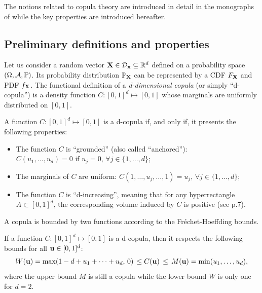 The notions related to copula theory are introduced in detail in the monographs of \citet{nelsen_2006_copulas,joe_2014,durante_2015_copula} while the key properties are introduced hereafter.


\subsection{Preliminary definitions and properties}\label{sec:copula_prelims}

Let us consider a random vector ${\bf X} \in \mathcal{D}_{{\bf x}}\subseteq\mathbb{R}^d$ defined on a probability space $(\Omega, \mathcal{A}, \mathbb{P})$. 
Its probability distribution $\mathbb{P}_{\bf X}$ can be represented by a CDF $F_{\bf X}$ and PDF $f_{\bf X}$. 
The functional definition of a \textit{d-dimensional copula} (or simply ``d-copula'') is a density function $C:[0, 1]^d \mapsto [0, 1]$ whose marginals are uniformly distributed on $[0, 1]$.
\begin{definition}[Copula]
    A function $C:[0, 1]^d \mapsto [0, 1]$ is a d-copula if, and only if, it presents the following properties:
    \begin{itemize}
        \item The function $C$ is ``grounded'' (also called ``anchored''): \\$C(u_1, \dots, u_d) = 0$ if $u_j=0, \, \forall j\in\{1, \dots, d\}$;
        \item The marginals of $C$ are uniform: $C(1, \dots, u_j, \dots, 1) = u_j,  \, \forall j\in\{1, \dots, d\}$;
        \item The function $C$ is ``d-increasing'', meaning that for any hyperrectangle $A \subset [0, 1]^d$, the corresponding volume induced by $C$ is positive (see \cite{durante_2015_copula} p.7). 
    \end{itemize}
\end{definition}
\medskip

A copula is bounded by two functions according to the Fr\'{e}chet-Hoeffding bounds. 
\begin{theorem}
    If a function $C:[0, 1]^d \mapsto [0, 1]$ is a d-copula, then it respects the following bounds for all ${\bf u} \in [0, 1]^d$: 
    \begin{equation}
        W({\bf u}) = \max (1 - d + u_1 + \dots + u_d, \, 0) \, \leq C({\bf u}) \, \leq \, M({\bf u}) = \min(u_1,\dots ,u_d),
    \end{equation} 
    where the upper bound $M$ is still a copula while the lower bound $W$ is only one for $d=2$.
\end{theorem}

